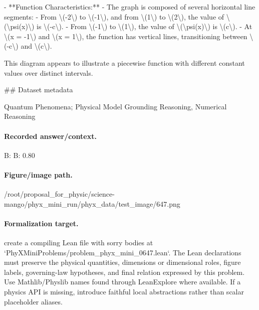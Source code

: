 - **Function Characteristics:**
  - The graph is composed of several horizontal line segments:
    - From \textbackslash{}(-2\textbackslash{}) to \textbackslash{}(-1\textbackslash{}), and from \textbackslash{}(1\textbackslash{}) to \textbackslash{}(2\textbackslash{}), the value of \textbackslash{}(\textbackslash{}psi(x)\textbackslash{}) is \textbackslash{}(-c\textbackslash{}).
    - From \textbackslash{}(-1\textbackslash{}) to \textbackslash{}(1\textbackslash{}), the value of \textbackslash{}(\textbackslash{}psi(x)\textbackslash{}) is \textbackslash{}(c\textbackslash{}).
    - At \textbackslash{}(x = -1\textbackslash{}) and \textbackslash{}(x = 1\textbackslash{}), the function has vertical lines, transitioning between \textbackslash{}(-c\textbackslash{}) and \textbackslash{}(c\textbackslash{}).

This diagram appears to illustrate a piecewise function with different constant values over distinct intervals.

\#\# Dataset metadata

Quantum Phenomena; Physical Model Grounding Reasoning, Numerical Reasoning

\paragraph{Recorded answer/context.}
B: B: 0.80

\paragraph{Figure/image path.}
/root/proposal\_for\_physic/science-mango/phyx\_mini\_run/phyx\_data/test\_image/647.png

\paragraph{Formalization target.}
create a compiling Lean file with sorry bodies at `PhyXMiniProblems/problem\_phyx\_mini\_0647.lean`. The Lean declarations must preserve the physical quantities, dimensions or dimensional roles, figure labels, governing-law hypotheses, and final relation expressed by this problem.
Use Mathlib/Physlib names found through LeanExplore where available. If a physics API is missing, introduce faithful local abstractions rather than scalar placeholder aliases.

